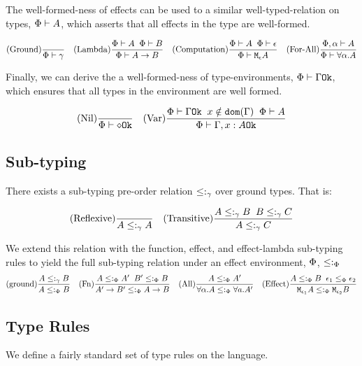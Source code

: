 \documentclass{Report}
\begin{document}
The well-formed-ness of effects can be used to a similar well-typed-relation on types, $\wellformed{\P}{A}$, which asserts that all effects in the type are well-formed.

\[
    \treerule{Ground}{}{\wellformed{\P}{\g}}
    \quad
    \treerule{Lambda}{\wellformed{\P}{A}\s\s\wellformed{\P}{B}}{\wellformed{\P}{\ab}}
    \quad
    \treerule{Computation}{\wellformed{\P}{A}\s\s\wellformed{\P}{\e}}{\wellformed{\P}{\mea}}
    \quad
    \treerule{For-All}{\wellformed{\P,\a}{A}}{\wellformed{\P}{\all{\a}{A}}}
\]

Finally, we can derive the a well-formed-ness of type-environments,   $\oke{\P}{\G}$, which ensures that all types in the environment are well formed.

\[
    \treerule{Nil}{}{\oke{\P}{\nil}}
    \quad
    \treerule{Var}{\oke{\P}{\G}\s\s x\notin\dom{\G}\s\s \wellformed{\P}{A}}{\oke{\P}{\gax}}
\]

\subsection{Sub-typing}
    There exists a sub-typing pre-order relation $\subtype_{\ground}$ over ground types. That is:

    \[
        \treerule{Reflexive}{}{A \subtype_{\ground} A}
        \quad
        \treerule{Transitive}{A \subtype_{\ground} B \s \s B \subtype_{\ground} C}{A \subtype_{\ground} C}
    \]

    We extend this relation with the function, effect, and effect-lambda sub-typing rules to yield the full sub-typing relation under an effect environment, $\P$, $\subtypep$
\[
    \treerule{ground}{A \subtype_{\ground} B}{A \subtypep B}
    \quad
    \treerule{Fn}{A \subtypep A' \s\s B' \subtypep B }{\fntype{A'}{B'} \subtypep \ab}
    \quad
    \treerule{All}{A\subtypep A'}{\all{\a}{A}\subtypep\all{a}{A'}}
    \quad
    \treerule{Effect}{A\subtypep B\s\s \e_1\subeffectp\e_2}{\M{\e_1}{A}\subtypep\M{\e_2}{B}}
\]


\subsection{Type Rules}
We define a fairly standard set of type rules on the language.
\end{document}
